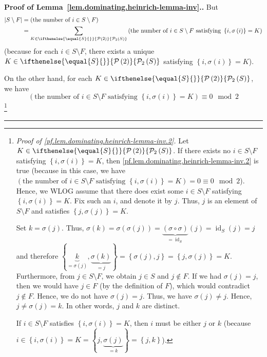 \documentclass[numbers=enddot,12pt,final,onecolumn,notitlepage]{scrartcl}%
\theoremstyle{definition}
\newenvironment{proof}[1][Proof]{\noindent\textbf{#1.} }{\ \rule{0.5em}{0.5em}}
\let\sumnonlimits\sum
\renewcommand{\sum}{\sumnonlimits\limits}
\newcommand{\id}{\operatorname{id}}
\newcommand{\powset}[2][]{\ifthenelse{\equal{#2}{}}{\mathcal{P}\left(#1\right)}{\mathcal{P}_{#1}\left(#2\right)}}
\newcommand{\set}[1]{\left\{ #1 \right\}}
\newcommand{\abs}[1]{\left| #1 \right|}
\newcommand{\tup}[1]{\left( #1 \right)}
\begin{document}
\begin{proof}[Proof of Lemma~\ref{lem.dominating.heinrich-lemma-inv}.]
But
\begin{align}
\abs{S \setminus F}
&= \tup{ \text{the number of } i \in S \setminus F } \nonumber \\
&= \sum_{K \in \powset[2]{S}}
      \tup{ \text{the number of } i \in S \setminus F
              \text{ satisfying } \set{i, \sigma\tup{i}} = K }
\label{pf.lem.dominating.heinrich-lemma-inv.1}
\end{align}
(because for each $i \in S \setminus F$, there exists a unique
$K \in \powset[2]{S}$ satisfying $\set{i, \sigma\tup{i}} = K$).

On the other hand, for each $K \in \powset[2]{S}$, we have
\begin{equation}
\tup{ \text{the number of } i \in S \setminus F
      \text{ satisfying } \set{i, \sigma\tup{i}} = K }
\equiv 0 \mod 2
\label{pf.lem.dominating.heinrich-lemma-inv.2}
\end{equation}
\footnote{\textit{Proof of
\eqref{pf.lem.dominating.heinrich-lemma-inv.2}.}
Let $K \in \powset[2]{S}$. If there exists no $i \in S \setminus F$
satisfying $\set{i, \sigma\tup{i}} = K$, then
\eqref{pf.lem.dominating.heinrich-lemma-inv.2} is true (because
in this case, we have
$\tup{ \text{the number of } i \in S \setminus F
       \text{ satisfying } \set{i, \sigma\tup{i}} = K }
= 0 \equiv 0 \mod 2$). Hence, we WLOG assume that there does exist
some $i \in S \setminus F$ satisfying $\set{i, \sigma\tup{i}} = K$.
Fix such an $i$, and denote it by $j$. Thus, $j$ is an element of
$S \setminus F$ and satisfies $\set{j, \sigma\tup{j}} = K$.

Set $k = \sigma\tup{j}$. Thus,
$\sigma\tup{k} = \sigma\tup{\sigma\tup{j}}
= \underbrace{\tup{\sigma \circ \sigma}}_{= \id_S} \tup{j}
= \id_S \tup{j} = j$
and therefore
$\set{\underbrace{k}_{=\sigma\tup{j}},
     \underbrace{\sigma\tup{k}}_{=j}}
= \set{\sigma\tup{j}, j} = \set{j, \sigma\tup{j}} = K$.
Furthermore, from $j \in S \setminus F$, we obtain $j \in S$ and
$j \notin F$. If we had $\sigma\tup{j} = j$, then we
would have $j \in F$ (by the definition of $F$), which would
contradict $j \notin F$. Hence, we do not have
$\sigma\tup{j} = j$. Thus, we have $\sigma\tup{j} \neq j$. Hence,
$j \neq \sigma\tup{j} = k$. In other words, $j$ and $k$ are distinct.

If $i \in S \setminus F$ satisfies $\set{i, \sigma\tup{i}} = K$, then
$i$ must be either $j$ or $k$ (because
$i \in \set{i, \sigma\tup{i}} = K
= \set{j, \underbrace{\sigma\tup{j}}_{=k}} = \set{j, k}$).

}
\end{proof}
\end{document}

